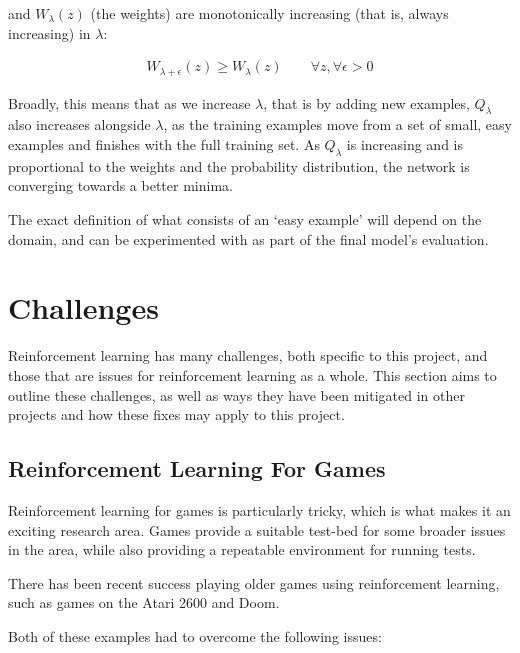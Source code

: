 and $W_{\lambda}(z)$ (the weights) are monotonically increasing (that is, always
increasing) in $\lambda$:

\begin{align}
    W_{\lambda + \epsilon}(z) \ge W_{\lambda}(z) \qquad
    \forall z, \forall \epsilon > 0
\end{align}

Broadly, this means that as we increase $\lambda$, that is by adding new
examples, $Q_{\lambda}$ also increases alongside $\lambda$, as the training
examples move from a set of small, easy examples and finishes with the full
training set. As $Q_{\lambda}$ is increasing and is proportional to the weights
and the probability distribution, the network is converging towards a better
minima.

The exact definition of what consists of an `easy example' will depend on the
domain, and can be experimented with as part of the final model's evaluation.

\section{Challenges}

Reinforcement learning has many challenges, both specific to this
project, and those that are issues for reinforcement learning as a whole.
This section aims to outline these challenges, as well as ways they have been
mitigated in other projects and how these fixes may apply to this project.

\subsection{Reinforcement Learning For Games}\label{challenges:games}

Reinforcement learning for games is particularly tricky, which is what makes it
an exciting research area. Games provide a suitable test-bed for some broader
issues in the area, while also providing a repeatable environment for running
tests.

There has been recent success playing older games using reinforcement learning,
such as games on the Atari 2600\cite{mnih2013playing} and
Doom\cite{kempka2016vizdoom}.

Both of these examples had to overcome the following issues:

